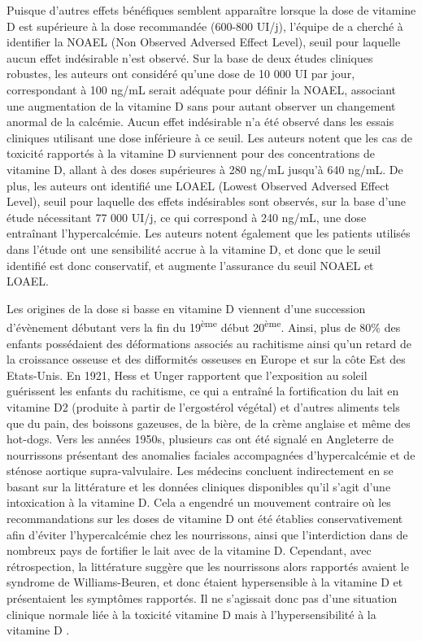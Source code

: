 \documentclass[
  a4paper,
  DIV=11,
  numbers=noendperiod,
  listof=totoc]{scrreprt}
\begin{document}
Puisque d'autres effets bénéfiques semblent apparaître lorsque la dose
de vitamine D est supérieure à la dose recommandée (600-800 UI/j),
l'équipe de \textcite{Hathcock.2007} a cherché à identifier la NOAEL
(Non Observed Adversed Effect Level), seuil pour laquelle aucun effet
indésirable n'est observé. Sur la base de deux études cliniques
robustes, les auteurs ont considéré qu'une dose de 10 000 UI par jour,
correspondant à 100 ng/mL serait adéquate pour définir la NOAEL,
associant une augmentation de la vitamine D sans pour autant observer un
changement anormal de la calcémie. Aucun effet indésirable n'a été
observé dans les essais cliniques utilisant une dose inférieure à ce
seuil. Les auteurs notent que les cas de toxicité rapportés à la
vitamine D surviennent pour des concentrations de vitamine D, allant à
des doses supérieures à 280 ng/mL jusqu'à 640 ng/mL. De plus, les
auteurs ont identifié une LOAEL (Lowest Observed Adversed Effect Level),
seuil pour laquelle des effets indésirables sont observés, sur la base
d'une étude nécessitant 77 000 UI/j, ce qui correspond à 240 ng/mL, une
dose entraînant l'hypercalcémie. Les auteurs notent également que les
patients utilisés dans l'étude ont une sensibilité accrue à la vitamine
D, et donc que le seuil identifié est donc conservatif, et augmente
l'assurance du seuil NOAEL et LOAEL.

Les origines de la dose si basse en vitamine D viennent d'une succession
d'évènement débutant vers la fin du 19\textsuperscript{ème} début
20\textsuperscript{ème}. Ainsi, plus de 80\% des enfants possédaient des
déformations associés au rachitisme ainsi qu'un retard de la croissance
osseuse et des difformités osseuses en Europe et sur la côte Est des
Etats-Unis. En 1921, Hess et Unger rapportent que l'exposition au soleil
guérissent les enfants du rachitisme, ce qui a entraîné la fortification
du lait en vitamine D2 (produite à partir de l'ergostérol végétal) et
d'autres aliments tels que du pain, des boissons gazeuses, de la bière,
de la crème anglaise et même des hot-dogs. Vers les années 1950s,
plusieurs cas ont été signalé en Angleterre de nourrissons présentant
des anomalies faciales accompagnées d'hypercalcémie et de sténose
aortique supra-valvulaire. Les médecins concluent indirectement en se
basant sur la littérature et les données cliniques disponibles qu'il
s'agit d'une intoxication à la vitamine D. Cela a engendré un mouvement
contraire où les recommandations sur les doses de vitamine D ont été
établies conservativement afin d'éviter l'hypercalcémie chez les
nourrissons, ainsi que l'interdiction dans de nombreux pays de fortifier
le lait avec de la vitamine D. Cependant, avec rétrospection, la
littérature suggère que les nourrissons alors rapportés avaient le
syndrome de Williams-Beuren, et donc étaient hypersensible à la vitamine
D et présentaient les symptômes rapportés. Il ne s'agissait donc pas
d'une situation clinique normale liée à la toxicité vitamine D mais à
l'hypersensibilité à la vitamine D \autocite{Holick.2015}.
\end{document}
